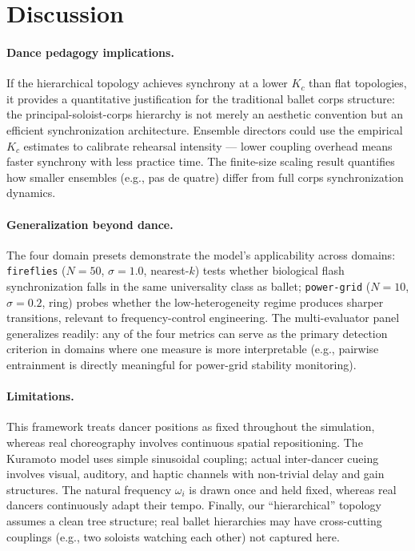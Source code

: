 \documentclass[11pt]{article}
\begin{document}
\section{Discussion}

\paragraph{Dance pedagogy implications.}
If the hierarchical topology achieves synchrony at a lower $K_c$ than flat topologies,
it provides a quantitative justification for the traditional ballet corps structure:
the principal-soloist-corps hierarchy is not merely an aesthetic convention but an
efficient synchronization architecture. Ensemble directors could use the empirical
$K_c$ estimates to calibrate rehearsal intensity --- lower coupling overhead means
faster synchrony with less practice time. The finite-size scaling result quantifies how
smaller ensembles (e.g., pas de quatre) differ from full corps synchronization dynamics.

\paragraph{Generalization beyond dance.}
The four domain presets demonstrate the model's applicability across domains:
\texttt{fireflies} ($N=50$, $\sigma=1.0$, nearest-$k$) tests whether biological flash
synchronization falls in the same universality class as ballet; \texttt{power-grid}
($N=10$, $\sigma=0.2$, ring) probes whether the low-heterogeneity regime produces
sharper transitions, relevant to frequency-control engineering. The multi-evaluator
panel generalizes readily: any of the four metrics can serve as the primary detection
criterion in domains where one measure is more interpretable (e.g., pairwise
entrainment is directly meaningful for power-grid stability monitoring).

\paragraph{Limitations.}
This framework treats dancer positions as fixed throughout the simulation, whereas real
choreography involves continuous spatial repositioning. The Kuramoto model uses simple
sinusoidal coupling; actual inter-dancer cueing involves visual, auditory, and haptic
channels with non-trivial delay and gain structures. The natural frequency $\omega_i$ is
drawn once and held fixed, whereas real dancers continuously adapt their tempo.
Finally, our ``hierarchical'' topology assumes a clean tree structure; real ballet
hierarchies may have cross-cutting couplings (e.g., two soloists watching each other)
not captured here.
\end{document}
